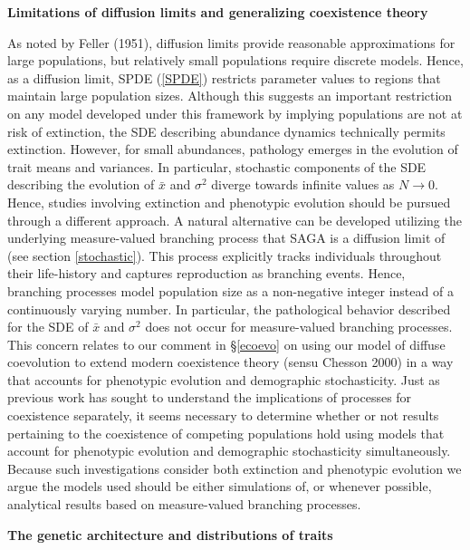 \documentclass[]{article}
\begin{document}
\textbf{Limitations of diffusion limits and generalizing coexistence
theory}

As noted by Feller (1951), diffusion limits provide reasonable
approximations for large populations, but relatively small populations
require discrete models. Hence, as a diffusion limit, SPDE (\ref{SPDE})
restricts parameter values to regions that maintain large population
sizes. Although this suggests an important restriction on any model
developed under this framework by implying populations are not at risk
of extinction, the SDE describing abundance dynamics technically permits
extinction. However, for small abundances, pathology emerges in the
evolution of trait means and variances. In particular, stochastic
components of the SDE describing the evolution of \(\bar x\) and
\(\sigma^2\) diverge towards infinite values as \(N\to0\). Hence,
studies involving extinction and phenotypic evolution should be pursued
through a different approach. A natural alternative can be developed
utilizing the underlying measure-valued branching process that SAGA is a
diffusion limit of (see section \ref{stochastic}). This process
explicitly tracks individuals throughout their life-history and captures
reproduction as branching events. Hence, branching processes model
population size as a non-negative integer instead of a continuously
varying number. In particular, the pathological behavior described for
the SDE of \(\bar x\) and \(\sigma^2\) does not occur for measure-valued
branching processes. This concern relates to our comment in
\S\ref{ecoevo} on using our model of diffuse coevolution to extend
modern coexistence theory (sensu Chesson 2000) in a way that accounts
for phenotypic evolution and demographic stochasticity. Just as previous
work has sought to understand the implications of processes for
coexistence separately, it seems necessary to determine whether or not
results pertaining to the coexistence of competing populations hold
using models that account for phenotypic evolution and demographic
stochasticity simultaneously. Because such investigations consider both
extinction and phenotypic evolution we argue the models used should be
either simulations of, or whenever possible, analytical results based on
measure-valued branching processes.

\textbf{The genetic architecture and distributions of traits}
\end{document}

